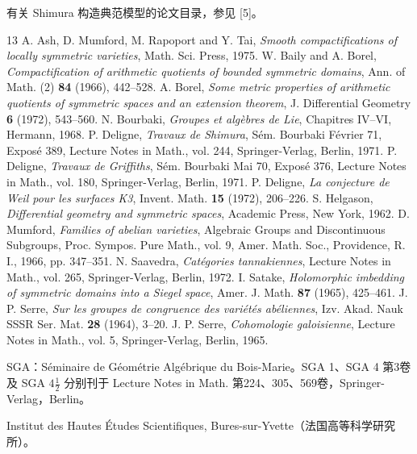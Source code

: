 有关 Shimura 构造典范模型的论文目录，参见 [5]。
\begin{thebibliography}{13}
 A. Ash, D. Mumford, M. Rapoport and Y. Tai, \textit{Smooth compactifications of locally symmetric varieties}, Math. Sci. Press, 1975.
 W. Baily and A. Borel, \textit{Compactification of arithmetic quotients of bounded symmetric domains}, Ann. of Math. (2) \textbf{84} (1966), 442--528.
 A. Borel, \textit{Some metric properties of arithmetic quotients of symmetric spaces and an extension theorem}, J. Differential Geometry \textbf{6} (1972), 543--560.
 N. Bourbaki, \textit{Groupes et algèbres de Lie}, Chapitres IV--VI, Hermann, 1968.
 P. Deligne, \textit{Travaux de Shimura}, Sém. Bourbaki Février 71, Exposé 389, Lecture Notes in Math., vol. 244, Springer-Verlag, Berlin, 1971.
 P. Deligne, \textit{Travaux de Griffiths}, Sém. Bourbaki Mai 70, Exposé 376, Lecture Notes in Math., vol. 180, Springer-Verlag, Berlin, 1971.
 P. Deligne, \textit{La conjecture de Weil pour les surfaces K3}, Invent. Math. \textbf{15} (1972), 206--226.
 S. Helgason, \textit{Differential geometry and symmetric spaces}, Academic Press, New York, 1962.
 D. Mumford, \textit{Families of abelian varieties}, Algebraic Groups and Discontinuous Subgroups, Proc. Sympos. Pure Math., vol. 9, Amer. Math. Soc., Providence, R. I., 1966, pp. 347--351.
 N. Saavedra, \textit{Catégories tannakiennes}, Lecture Notes in Math., vol. 265, Springer-Verlag, Berlin, 1972.
 I. Satake, \textit{Holomorphic imbedding of symmetric domains into a Siegel space}, Amer. J. Math. \textbf{87} (1965), 425--461.
 J. P. Serre, \textit{Sur les groupes de congruence des variétés abéliennes}, Izv. Akad. Nauk SSSR Ser. Mat. \textbf{28} (1964), 3--20.
 J. P. Serre, \textit{Cohomologie galoisienne}, Lecture Notes in Math., vol. 5, Springer-Verlag, Berlin, 1965.
\end{thebibliography}
SGA：Séminaire de Géométrie Algébrique du Bois-Marie。SGA 1、SGA 4 第3卷及 SGA $4\frac12$ 分别刊于 Lecture Notes in Math. 第224、305、569卷，Springer-Verlag，Berlin。

\noindent Institut des Hautes Études Scientifiques, Bures-sur-Yvette（法国高等科学研究所）。
